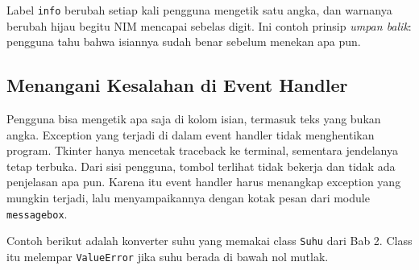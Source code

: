 
Label \texttt{info} berubah setiap kali pengguna mengetik satu angka, dan warnanya berubah hijau begitu NIM mencapai sebelas digit. Ini contoh prinsip \emph{umpan balik}: pengguna tahu bahwa isiannya sudah benar sebelum menekan apa pun.

\subsection{Menangani Kesalahan di Event Handler}

Pengguna bisa mengetik apa saja di kolom isian, termasuk teks yang bukan angka. Exception yang terjadi di dalam event handler tidak menghentikan program. Tkinter hanya mencetak traceback ke terminal, sementara jendelanya tetap terbuka. Dari sisi pengguna, tombol terlihat tidak bekerja dan tidak ada penjelasan apa pun. Karena itu event handler harus menangkap exception yang mungkin terjadi, lalu menyampaikannya dengan kotak pesan dari module \texttt{messagebox}.

Contoh berikut adalah konverter suhu yang memakai class \texttt{Suhu} dari Bab 2. Class itu melempar \texttt{ValueError} jika suhu berada di bawah nol mutlak.

